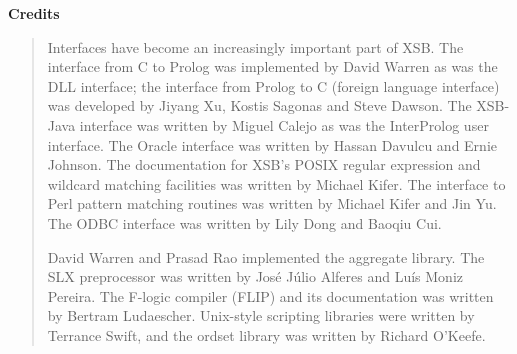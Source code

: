 
\begin{center}
{\bf {\Large 
		Credits
}}
\end{center}


\begin{quote}
  Interfaces have become an increasingly important part of XSB.  The
  interface from C to Prolog was implemented by David Warren as was the DLL
  interface; the interface from Prolog to C (foreign language interface)
  was developed by Jiyang Xu, Kostis Sagonas and Steve Dawson.  The
  XSB-Java interface was written by Miguel Calejo as was the InterProlog
  user interface.  The Oracle interface was written by Hassan Davulcu and
  Ernie Johnson. The documentation for XSB's POSIX regular expression and
  wildcard matching facilities was written by Michael Kifer.  The interface
  to Perl pattern matching routines was written by Michael Kifer and Jin
  Yu.  The ODBC interface was written by Lily Dong and Baoqiu Cui.

David Warren and Prasad Rao implemented the aggregate library.  The SLX
preprocessor was written by Jos\'e J\'ulio Alferes and Lu\'is Moniz
Pereira.  The F-logic compiler (FLIP) and its documentation was written by
Bertram Ludaescher.  Unix-style scripting libraries were written by
Terrance Swift, and the ordset library was written by Richard O'Keefe.
\end{quote}

